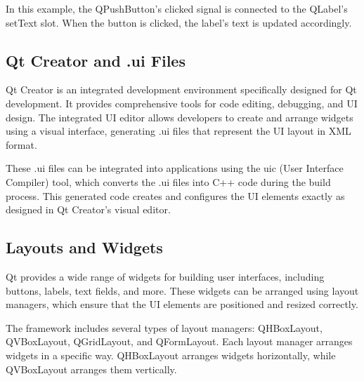 In this example, the QPushButton's clicked signal is connected to the QLabel's setText slot. When the button is clicked, the label's text is updated accordingly.

\subsection{Qt Creator and .ui Files}
Qt Creator is an integrated development environment specifically designed for Qt development. It provides comprehensive tools for code editing, debugging, and UI design. The integrated UI editor allows developers to create and arrange widgets using a visual interface, generating .ui files that represent the UI layout in XML format.

These .ui files can be integrated into applications using the uic (User Interface Compiler) tool, which converts the .ui files into C++ code during the build process. This generated code creates and configures the UI elements exactly as designed in Qt Creator's visual editor.

\subsection{Layouts and Widgets}
Qt provides a wide range of widgets for building user interfaces, including buttons, labels, text fields, and more. These widgets can be arranged using layout managers, which ensure that the UI elements are positioned and resized correctly.

The framework includes several types of layout managers: QHBoxLayout, QVBoxLayout, QGridLayout, and QFormLayout. Each layout manager arranges widgets in a specific way. QHBoxLayout arranges widgets horizontally, while QVBoxLayout arranges them vertically.

